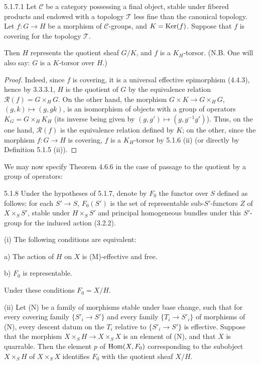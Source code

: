 \begin{corollary}{5.1.7.1}\label{IV.5.1.7.1}
Let \(\mathcal C\) be a category possessing a final object,
stable under fibered products and endowed with a
topology \(\mathcal T\) less fine than the canonical topology.
Let \(f:G\to H\) be a morphism of \(\mathcal C\)-groups,
and \(K=\operatorname{Ker}(f)\). Suppose that \(f\) is covering for
the topology \(\mathcal T\).

Then \(H\) represents the quotient sheaf \(G/K\),
and \(f\) is a \(K_H\)-torsor.
(N.B. One will also say: \og \(G\) is a \(K\)-torsor
over \(H\)\fg.)
\end{corollary}
\begin{proof}
Indeed, since \(f\) is covering, it is a universal
effective epimorphism (4.4.3), hence by 3.3.3.1,
\(H\) is the quotient of \(G\) by the equivalence
relation \(\mathcal R(f)=G\times_H G\).
On the other hand, the morphism \(G\times K\to G\times_H G\),
\((g,k)\mapsto(g,gk)\), is an isomorphism of objects
with a group of operators \(K_G=G\times_H K_H\)
(its inverse being given by \((g,g')\mapsto(g,g^{-1}g')\)).
Thus, on the one hand, \(\mathcal R(f)\) is the
equivalence relation defined by \(K\); on the other,
since the morphism \(f:G\to H\) is covering,
\(f\) is a \(K_H\)-torsor by 5.1.6 (ii)
(or directly by Definition 5.1.5 (ii)).
\end{proof}
We may now specify Theorem 4.6.6 in the case of passage
to the quotient by a group of operators:
\begin{proposition}{5.1.8}\label{IV.5.1.8}
Under the hypotheses of 5.1.7, denote by \(F_0\)
the functor over \(S\) defined as follows:
for each \(S'\to S\), \(F_0(S')\) is the set of
representable sub-\(S'\)-functors \(Z\) of \(X\times_S S'\),
stable under \(H\times_S S'\) and principal homogeneous
bundles under this \(S'\)-group for the induced action (3.2.2).

(i) The following conditions are equivalent:

a) The action of \(H\) on \(X\) is (M)-effective and free.

b) \(F_0\) is representable.

Under these conditions \(F_0=X/H\).

(ii) Let (N) be a family of morphisms stable under
base change, such that for every covering family
\(\{S'_i\to S'\}\) and every family \(\{T_i\to S'_i\}\)
of morphisms of (N), every descent datum on the
\(T_i\) relative to \(\{S'_i\to S'\}\) is effective.
Suppose that the morphism \(X\times_S H\to X\times_S X\)
is an element of (N), and that \(X\) is quarrable.
Then the element \(p\) of \(\operatorname{Hom}(X,F_0)\) corresponding
to the subobject \(X\times_S H\) of \(X\times_S X\)
identifies \(F_0\) with the quotient sheaf \(X/H\).
\end{proposition}


